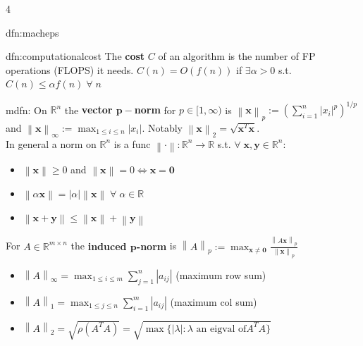 \documentclass[landscape, 8pt]{extarticle}
\begin{document}
\begin{multicols*}{4}
\begin{dfn}{dfn:macheps}{ }
		\end{dfn}
		
		
		\begin{dfn}{dfn:computationalcost}{ }
			The \textbf{cost} $C$ of an algorithm is the number of FP operations (FLOPS) it needs. $C(n) = O(f(n))$ if $\exists \alpha > 0$ s.t. $C(n) \le \alpha f(n) \; \forall \; n$
			
		\end{dfn}
		
		
		\begin{mdfn}[Norms]{mdfn:}{ }
			On $\mathbb{R}^n$ the \textbf{vector $\mathbf{p}-$norm} for $p\in [1, \infty)$ is $\left\lVert \mathbf{x} \right\rVert_p := (\sum^{n}_{i=1} \left|x_i\right|^p)^{1/p}$ and $\left\lVert \mathbf{x}\right\rVert_\infty := \max_{1 \le i \le n} \left|x_i\right|$. Notably $\left\lVert \mathbf{x}\right\rVert_2 = \sqrt{\mathbf{x}^T\mathbf{x}}$.\\
			In general a norm on $\mathbb{R}^n$ is a func $\left\lVert \cdot \right\rVert:\mathbb{R}^n \to \mathbb{R}$ s.t. $\forall \; \mathbf{x, y}\in \mathbb{R}^n$:
			\begin{itemize}
				\item $\left\lVert \mathbf{x}\right\rVert \ge 0$ and $\left\lVert \mathbf{x}\right\rVert = 0 \iff \mathbf{x} = \mathbf{0}$
				\item $\left\lVert \alpha\mathbf{x}\right\rVert = \left|\alpha\right| \left\lVert \mathbf{x}\right\rVert \; \forall \; \alpha\in \mathbb{R}$
				\item $\left\lVert \mathbf{x} + \mathbf{y}\right\rVert \le \left\lVert \mathbf{x}\right\rVert + \left\lVert \mathbf{y}\right\rVert$
			\end{itemize}
			For $A\in \mathbb{R}^{m \times n}$ the \textbf{induced $\mathbf{p}$-norm} is $\left\lVert A\right\rVert_p := \max_{\mathbf{x \ne 0}} \frac{\left\lVert A\mathbf{x}\right\rVert_p}{\left\lVert \mathbf{x}\right\rVert_p}$
			\begin{itemize}
				\item $\left\lVert A\right\rVert_\infty = \max_{1 \le i \le m} \sum^{n}_{j=1} \left|a_{ij}\right|$ (maximum row sum)
				\item $\left\lVert A\right\rVert_1 = \max_{1 \le j \le n} \sum^{m}_{i=1} \left|a_{ij}\right|$ (maximum col sum)
				\item $\left\lVert A\right\rVert_2 = \sqrt{\rho(A^TA)} = \sqrt{\max\{\left|\lambda\right| : \lambda \text{ an eigval of} A^TA\}}$
			\end{itemize}
			

\end{mdfn}
\end{multicols*}
\end{document}
